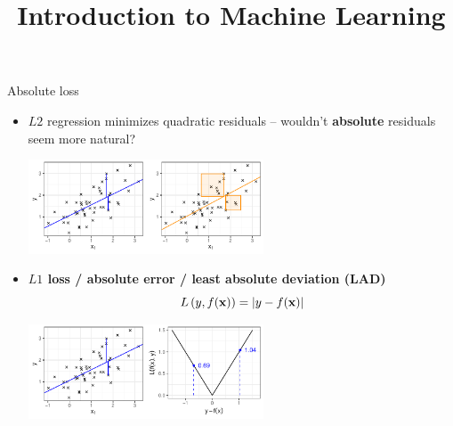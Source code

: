 \documentclass[11pt,compress,t,notes=noshow, xcolor=table]{beamer}
\title{Introduction to Machine Learning}
\institute{\href{https://compstat-lmu.github.io/lecture_i2ml/}{compstat-lmu.github.io/lecture\_i2ml}}
\date{}
\begin{document}


\begin{vbframe}{Absolute loss}

\begin{itemize}
    \item $L2$ regression minimizes quadratic residuals -- wouldn't 
    \textbf{absolute} residuals seem more natural? 
    \vspace{0.2cm}
    \begin{center}
    \includegraphics[width=0.55\textwidth]{figure/reg_l1_residual_abs_vs_quad}
    \end{center}
    \item \textbf{$L1$ loss / absolute error / least absolute deviation (LAD)}
    $$L\left(y, f(\mathbf{x})\right) = |y - f(\mathbf{x})|$$
    \begin{center}
    \includegraphics[width=0.55\textwidth]{figure/reg_l1_lossplot_abs}
    \end{center}
\end{itemize}

\end{vbframe}

\end{document}
